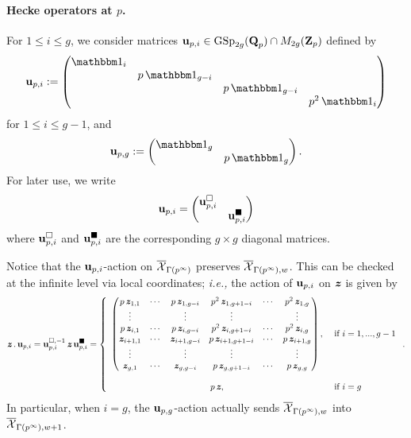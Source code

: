 \paragraph{Hecke operators at $p$.} For $1\leq i\leq g$, we consider matrices $\bfu_{p,i}\in \GSp_{2g}(\Q_p)\cap M_{2g}(\Z_p)$ defined by
$$
\bfu_{p,i}:=\begin{pmatrix} \one_i \\ & p\one_{g-i}\\ & & p\one_{g-i}\\ & & & p^2\one_i\end{pmatrix}$$
for $1\leq i\leq g-1$, and
$$\bfu_{p,g}:=\begin{pmatrix}\one_g\\ & p\one_g\end{pmatrix}.$$
For later use, we write $$\bfu_{p, i}=\begin{pmatrix}\bfu_{p,i}^{\square} & \\ & \bfu_{p, i}^{\blacksquare}\end{pmatrix}$$ where $\bfu_{p, i}^{\square}$ and $\bfu_{p, i}^{\blacksquare}$ are the corresponding $g\times g$ diagonal matrices.

Notice that the $\bfu_{p,i}$-action on $\overline{\calX}_{\Gamma(p^{\infty})}$ preserves $\overline{\calX}_{\Gamma(p^{\infty}),w}$. This can be checked at the infinite level via local coordinates; \emph{i.e.,} the action of $\bfu_{p, i}$ on $\bfitz$ is given by $$\bfitz.\bfu_{p,i}=\bfu_{p,i}^{\square, -1}\bfitz\bfu_{p,i}^{\blacksquare}=\left\{\begin{array}{cl}
    \begin{pmatrix}
    p\bfitz_{1,1} & \cdots & p\bfitz_{1,g-i} & p^2\bfitz_{1,g+1-i} & \cdots & p^2\bfitz_{1,g}\\
    \vdots & & \vdots & \vdots && \vdots\\
    p\bfitz_{i,1} & \cdots & p\bfitz_{i,g-i} & p^2\bfitz_{i,g+1-i} & \cdots & p^2\bfitz_{i,g}\\
    \bfitz_{i+1,1} & \cdots & \bfitz_{i+1,g-i} & p\bfitz_{i+1,g+1-i} & \cdots & p\bfitz_{i+1,g}\\
    \vdots && \vdots & \vdots && \vdots\\
    \bfitz_{g,1} & \cdots & \bfitz_{g,g-i} & p\bfitz_{g,g+1-i} & \cdots & p\bfitz_{g,g}
    \end{pmatrix}, & \text{ if }i=1, ..., g-1 \\ \\
    p\bfitz, & \text{ if }i=g
\end{array}\right..$$ In particular, when $i=g$, the $\bfu_{p,g}$-action actually sends $\overline{\calX}_{\Gamma(p^{\infty}), w}$ into $\overline{\calX}_{\Gamma(p^{\infty}), w+1}$.

